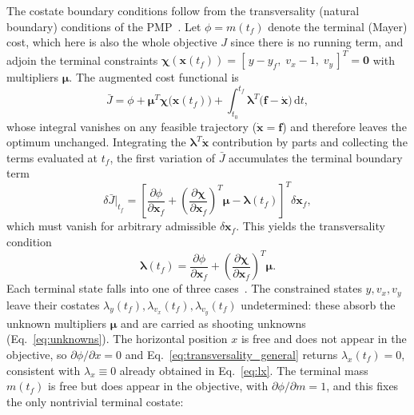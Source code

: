 \documentclass[../main.tex]{subfiles}
\begin{document}
The costate boundary conditions follow from the transversality (natural boundary) conditions of the PMP~\cite[Ch.~2]{bryson1975}. Let $\phi = m(t_f)$ denote the terminal (Mayer) cost, which here is also the whole objective $J$ since there is no running term, and adjoin the terminal constraints $\boldsymbol{\chi}(\mathbf{x}(t_f)) = [\,y - y_f,\; v_x - 1,\; v_y\,]^T = \mathbf{0}$ with multipliers $\boldsymbol{\mu}$. The augmented cost functional is
\begin{equation}
    \bar{J} = \phi + \boldsymbol{\mu}^T\boldsymbol{\chi}\bigl(\mathbf{x}(t_f)\bigr)
    + \int_{t_0}^{t_f}\!\boldsymbol{\lambda}^T\!\bigl(\mathbf{f} - \dot{\mathbf{x}}\bigr)\,\mathrm{d}t,
    \label{eq:aug_payoff}
\end{equation}
whose integral vanishes on any feasible trajectory ($\dot{\mathbf{x}} = \mathbf{f}$) and therefore leaves the optimum unchanged. Integrating the $\boldsymbol{\lambda}^T\dot{\mathbf{x}}$ contribution by parts and collecting the terms evaluated at $t_f$, the first variation of $\bar{J}$ accumulates the terminal boundary term
\begin{equation}
    \delta\bar{J}\big|_{t_f} =
    \left[\frac{\partial \phi}{\partial \mathbf{x}_f}
    + \left(\frac{\partial \boldsymbol{\chi}}{\partial \mathbf{x}_f}\right)^{\!T}\!\boldsymbol{\mu}
    - \boldsymbol{\lambda}(t_f)\right]^{\!T}\!\delta\mathbf{x}_f ,
\end{equation}
which must vanish for arbitrary admissible $\delta\mathbf{x}_f$. This yields the transversality condition
\begin{equation}
    \boldsymbol{\lambda}(t_f) = \frac{\partial \phi}{\partial \mathbf{x}_f}
    + \left(\frac{\partial \boldsymbol{\chi}}{\partial \mathbf{x}_f}\right)^{\!T}\!\boldsymbol{\mu}.
    \label{eq:transversality_general}
\end{equation}
Each terminal state falls into one of three cases~\cite[Lecture~5]{dclvnotes}. The constrained states $y, v_x, v_y$ leave their costates $\lambda_y(t_f), \lambda_{v_x}(t_f), \lambda_{v_y}(t_f)$ undetermined: these absorb the unknown multipliers $\boldsymbol{\mu}$ and are carried as shooting unknowns (Eq.~\ref{eq:unknowns}). The horizontal position $x$ is free and does not appear in the objective, so $\partial\phi/\partial x = 0$ and Eq.~\eqref{eq:transversality_general} returns $\lambda_x(t_f) = 0$, consistent with $\lambda_x \equiv 0$ already obtained in Eq.~\eqref{eq:lx}. The terminal mass $m(t_f)$ is free but does appear in the objective, with $\partial\phi/\partial m = 1$, and this fixes the only nontrivial terminal costate:
\end{document}
